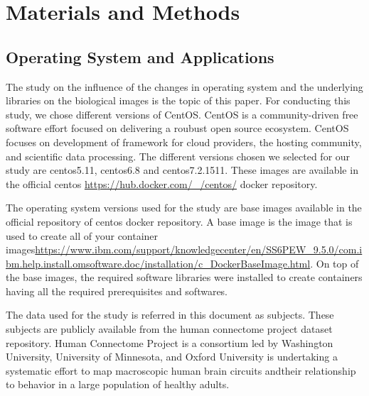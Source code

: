 \documentclass{article}
\begin{document}
\section{Materials and Methods}
\begin{itemize}
\subsection{Operating System and Applications} 
The study on the influence of the changes in operating system and the underlying libraries on the biological images is the topic of this paper. For conducting this study, we chose different versions of CentOS. CentOS is a community-driven  free software effort focused on delivering a roubust open source ecosystem. CentOS focuses on development of framework for cloud providers, the hosting community, and scientific data processing.\cite{https://www.centos.org/about/} The different versions chosen we selected for our study are centos5.11, centos6.8 and centos7.2.1511. These images are available in the official centos \url{https://hub.docker.com/\_/centos/} docker repository.

The operating system versions used for the study are base images available in the official repository of centos docker repository. A base image is the image that is used to create all of your container images\url{https://www.ibm.com/support/knowledgecenter/en/SS6PEW\_9.5.0/com.ibm.help.install.omsoftware.doc/installation/c\_DockerBaseImage.html}. On top of the base images, the required software libraries were installed to create containers having all the required prerequisites and softwares.

The data used for the study is referred in this document as subjects. These subjects are publicly available from the human connectome project dataset repository. Human Connectome Project\cite{The WU-Minn Human Connectome Project: An Overview} is a consortium led by Washington University, University of Minnesota, and Oxford University is undertaking a systematic effort to map macroscopic human brain circuits andtheir relationship to behavior in a large population of healthy adults.


\end{itemize}
\end{document}
